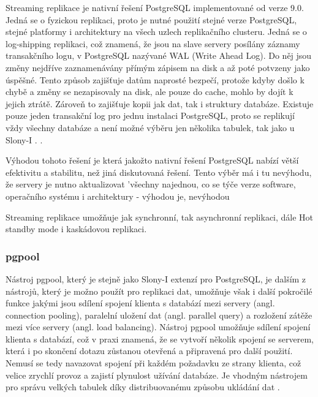       Streaming replikace je nativní řešení PostgreSQL implementované od verze 9.0. Jedná se o fyzickou replikaci, proto je nutné použití stejné verze PostgreSQL, stejné platformy i architektury na všech uzlech replikačního clusteru. Jedná se o log-shipping replikaci, což znamená, že jsou na slave servery posílány záznamy transakčního logu, v PostgreSQL nazývané WAL (Write Ahead Log). Do něj jsou změny nejdříve zaznamenávány přímým zápisem na disk a až poté potvzeny jako úspěšné. Tento způsob zajišťuje datům naprosté bezpečí, protože kdyby došlo k chybě a změny se nezapisovaly na disk, ale pouze do cache, mohlo by dojít k jejich ztrátě. Zároveň to zajišťuje kopii jak dat, tak i struktury databáze. Existuje pouze jeden transakční log pro jednu instalaci PostgreSQL, proto se replikují vždy všechny databáze a není možné výběru jen několika tabulek, tak jako u Slony-I \citep{Boszormenyi2013}. . 
 
      {\color{purpurova7}Výhodou tohoto řešení je která jakožto nativní řešení PostgreSQL nabízí větší efektivitu a stabilitu, než jiná diskutovaná řešení. Tento výběr má i tu nevýhodu, že servery je nutno aktualizovat 'všechny najednou, co se týče verze software, operačního systému i architektury - výhodou je, nevýhodou }

Streaming replikace umožňuje jak synchronní, tak asynchronní replikaci, dále Hot standby mode i kaskádovou replikaci.

      \subsubsection{pgpool}
      \label{kpgpool}

      Nástroj pgpool, který je stejně jako Slony-I extenzí pro PostgreSQL, je dalším z nástrojů, který je možno použít pro replikaci dat, umožňuje však i další pokročilé funkce jakými jsou sdílení spojení klienta s databází mezi servery (angl. connection pooling), paralelní uložení dat (angl. parallel query) a rozložení zátěže mezi více servery (angl. load balancing). 
Nástroj pgpool umožňuje sdílení spojení klienta s databází, což v praxi znamená, že se vytvoří několik spojení se serverem, která i po skončení dotazu zůstanou otevřená a připravená pro další použití. Nemusí se tedy navazovat spojení při každém požadavku ze strany klienta, což velice zrychlí provoz a zajistí plynulost užívání databáze. Je vhodným nástrojem pro správu velkých tabulek díky distribuovanému způsobu ukládání dat \citep{pgpool2014}. 

